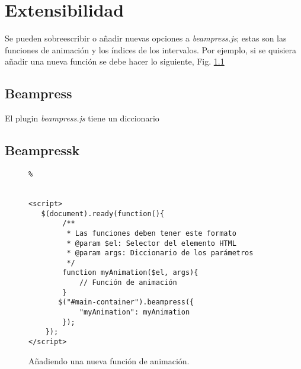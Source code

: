 \chapter{Extensibilidad} %
\label{cha:extensibilidad}
	Se pueden sobreescribir o añadir nuevas opciones a \textit{beampress.js}; estas son
	las funciones de animación y los índices de los intervalos. Por ejemplo, si se quisiera
	añadir una nueva función se debe hacer lo siguiente, Fig. \ref{fig:ex6}

	\section{Beampress} %
	\label{sec:beampress}
		El plugin \textit{beampress.js} tiene un diccionario \texttt{}

	\section{Beampressk} %
	\label{sec:beampressk}
	

		\begin{figure}[htb]%
			\begin{lstlisting}%


<script>
   $(document).ready(function(){
       	/**
		 * Las funciones deben tener este formato
		 * @param $el: Selector del elemento HTML  
		 * @param args: Diccionario de los parámetros
		 */
   		function myAnimation($el, args){
   			// Función de animación 
   		}     
       $("#main-container").beampress({
       		"myAnimation": myAnimation
       	});
    });
</script>

			\end{lstlisting}
		\caption{
			Añadiendo una nueva función de animación. 
			\label{fig:ex6} }
		\end{figure}	
